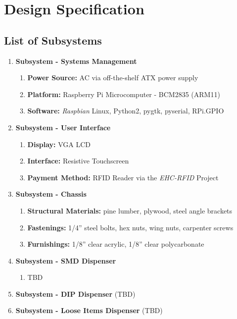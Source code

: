 \documentclass[12pt,draft,oneside]{article}
\begin{document}
\section{Design Specification}
\label{sec:spec}

\subsection{List of Subsystems}
\begin{enumerate}
  \item \textbf{Subsystem - Systems Management}
    \begin{enumerate}
      \item \textbf{Power Source:} AC via off-the-shelf ATX power supply
      \item \textbf{Platform:} Raspberry Pi Microcomputer - BCM2835 (ARM11)
      \item \textbf{Software:} \emph{Raspbian} Linux, Python2, pygtk, pyserial, RPi.GPIO
    \end{enumerate}
  \item \textbf{Subsystem - User Interface}
    \begin{enumerate}
      \item \textbf{Display:} VGA LCD
      \item \textbf{Interface:} Resistive Touchscreen
      \item \textbf{Payment Method:} RFID Reader via the \emph{EHC-RFID} Project
    \end{enumerate}
  \item \textbf{Subsystem - Chassis}
    \begin{enumerate}
      \item \textbf{Structural Materials:} pine lumber, plywood, steel angle brackets
      \item \textbf{Fastenings:} 1/4'' steel bolts, hex nuts, wing nuts, carpenter screws
      \item \textbf{Furnishings:} 1/8'' clear acrylic, 1/8'' clear polycarbonate
    \end{enumerate}
  \item \textbf{Subsystem - SMD Dispenser}
    \begin{enumerate}
      \item TBD
    \end{enumerate}
  \item \textbf{Subsystem - DIP Dispenser} (TBD)
  \item \textbf{Subsystem - Loose Items Dispenser} (TBD)
\end{enumerate}
\end{document}

